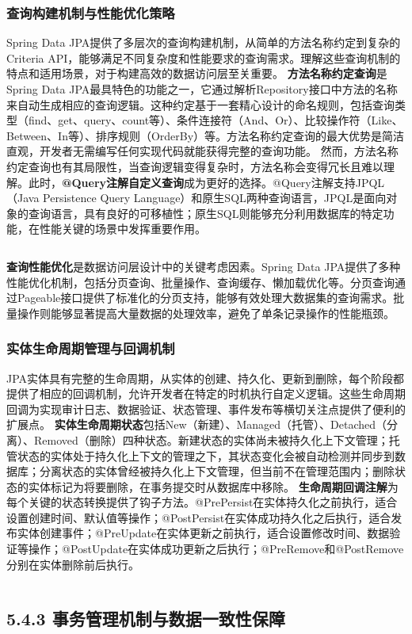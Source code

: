 \subsubsection{查询构建机制与性能优化策略}\label{ux67e5ux8be2ux6784ux5efaux673aux5236ux4e0eux6027ux80fdux4f18ux5316ux7b56ux7565}
Spring Data JPA提供了多层次的查询构建机制，从简单的方法名称约定到复杂的Criteria API，能够满足不同复杂度和性能要求的查询需求。理解这些查询机制的特点和适用场景，对于构建高效的数据访问层至关重要。
\textbf{方法名称约定查询}是Spring Data
JPA最具特色的功能之一，它通过解析Repository接口中方法的名称来自动生成相应的查询逻辑。这种约定基于一套精心设计的命名规则，包括查询类型（find、get、query、count等）、条件连接符（And、Or）、比较操作符（Like、Between、In等）、排序规则（OrderBy）等。方法名称约定查询的最大优势是简洁直观，开发者无需编写任何实现代码就能获得完整的查询功能。
然而，方法名称约定查询也有其局限性，当查询逻辑变得复杂时，方法名称会变得冗长且难以理解。此时，\textbf{@Query注解自定义查询}成为更好的选择。@Query注解支持JPQL（Java Persistence Query
Language）和原生SQL两种查询语言，JPQL是面向对象的查询语言，具有良好的可移植性；原生SQL则能够充分利用数据库的特定功能，在性能关键的场景中发挥重要作用。 \begin{lstlisting}[language=Java]
\end{lstlisting} \textbf{查询性能优化}是数据访问层设计中的关键考虑因素。Spring Data
JPA提供了多种性能优化机制，包括分页查询、批量操作、查询缓存、懒加载优化等。分页查询通过Pageable接口提供了标准化的分页支持，能够有效处理大数据集的查询需求。批量操作则能够显著提高大量数据的处理效率，避免了单条记录操作的性能瓶颈。
\subsubsection{实体生命周期管理与回调机制}\label{ux5b9eux4f53ux751fux547dux5468ux671fux7ba1ux7406ux4e0eux56deux8c03ux673aux5236}
JPA实体具有完整的生命周期，从实体的创建、持久化、更新到删除，每个阶段都提供了相应的回调机制，允许开发者在特定的时机执行自定义逻辑。这些生命周期回调为实现审计日志、数据验证、状态管理、事件发布等横切关注点提供了便利的扩展点。
\textbf{实体生命周期状态}包括New（新建）、Managed（托管）、Detached（分离）、Removed（删除）四种状态。新建状态的实体尚未被持久化上下文管理；托管状态的实体处于持久化上下文的管理之下，其状态变化会被自动检测并同步到数据库；分离状态的实体曾经被持久化上下文管理，但当前不在管理范围内；删除状态的实体标记为将要删除，在事务提交时从数据库中移除。
\textbf{生命周期回调注解}为每个关键的状态转换提供了钩子方法。@PrePersist在实体持久化之前执行，适合设置创建时间、默认值等操作；@PostPersist在实体成功持久化之后执行，适合发布实体创建事件；@PreUpdate在实体更新之前执行，适合设置修改时间、数据验证等操作；@PostUpdate在实体成功更新之后执行；@PreRemove和@PostRemove分别在实体删除前后执行。
\begin{lstlisting}[language=Java] \end{lstlisting} \subsection{5.4.3
事务管理机制与数据一致性保障}\label{ux4e8bux52a1ux7ba1ux7406ux673aux5236ux4e0eux6570ux636eux4e00ux81f4ux6027ux4fddux969c}
